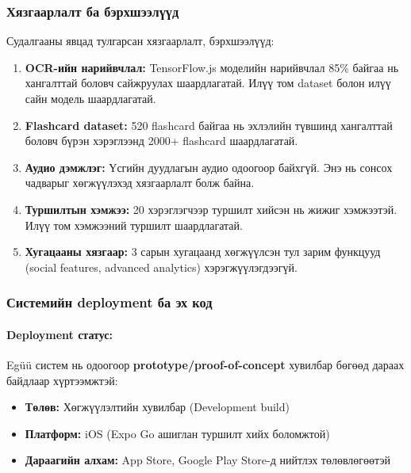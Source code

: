 \subsubsection{Хязгаарлалт ба бэрхшээлүүд}
\label{subsec:limitations}

Судалгааны явцад тулгарсан хязгаарлалт, бэрхшээлүүд:

\begin{enumerate}
    \item \textbf{OCR-ийн нарийвчлал:} TensorFlow.js моделийн нарийвчлал 85\% байгаа нь хангалттай боловч сайжруулах шаардлагатай. Илүү том dataset болон илүү сайн модель шаардлагатай.
    
    \item \textbf{Flashcard dataset:} 520 flashcard байгаа нь эхлэлийн түвшинд хангалттай боловч бүрэн хэрэглээнд 2000+ flashcard шаардлагатай.
    
    \item \textbf{Аудио дэмжлэг:} Үсгийн дуудлагын аудио одоогоор байхгүй. Энэ нь сонсох чадварыг хөгжүүлэхэд хязгаарлалт болж байна.
    
    \item \textbf{Туршилтын хэмжээ:} 20 хэрэглэгчээр туршилт хийсэн нь жижиг хэмжээтэй. Илүү том хэмжээний туршилт шаардлагатай.
    
    \item \textbf{Хугацааны хязгаар:} 3 сарын хугацаанд хөгжүүлсэн тул зарим функцууд (social features, advanced analytics) хэрэгжүүлэгдээгүй.
\end{enumerate}

\subsubsection{Системийн deployment ба эх код}
\label{subsec:deployment}

\paragraph{Deployment статус:}

Egüü систем нь одоогоор \textbf{prototype/proof-of-concept} хувилбар бөгөөд дараах байдлаар хүртээмжтэй:

\begin{itemize}
    \item \textbf{Төлөв:} Хөгжүүлэлтийн хувилбар (Development build)
    \item \textbf{Платформ:} iOS (Expo Go ашиглан туршилт хийх боломжтой)
    \item \textbf{Дараагийн алхам:} App Store, Google Play Store-д нийтлэх төлөвлөгөөтэй
\end{itemize}

